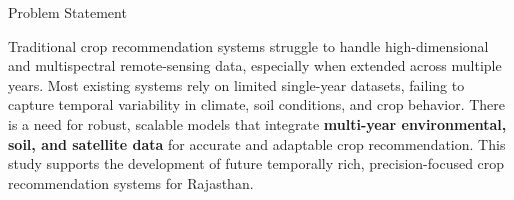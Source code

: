 \documentclass[aspectratio=169]{beamer}
\begin{document}
\begin{frame}{Problem Statement }

Traditional crop recommendation systems struggle to handle high-dimensional and multispectral remote-sensing data, especially when extended across multiple years. Most existing systems rely on limited single-year datasets, failing to capture temporal variability in climate, soil conditions, and crop behavior. There is a need for robust, scalable models that integrate \textbf{multi-year environmental, soil, and satellite data} for accurate and adaptable crop recommendation. This study supports the development of future temporally rich, precision-focused crop recommendation systems for Rajasthan.

\end{frame}

    


\end{document}
